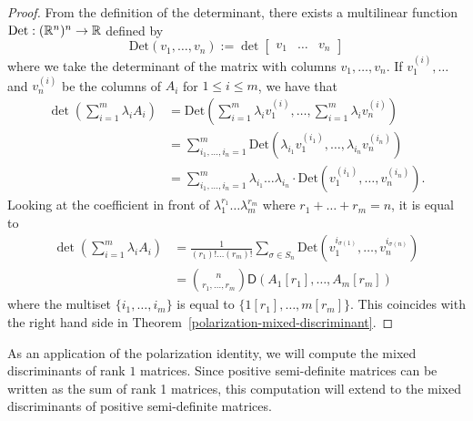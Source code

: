 \documentclass{puthesis-UG}
\begin{document}
\begin{proof}
	From the definition of the determinant, there exists a multilinear function $\text{Det}: (\mathbb{R}^n)^n \to \mathbb{R}$ defined by 
	\[
		\text{Det}(v_1, \ldots, v_n) := \det \begin{bmatrix} v_1 & \ldots & v_n \end{bmatrix}
	\]
	where we take the determinant of the matrix with columns $v_1, \ldots, v_n$. If $v_1^{(i)}, \ldots$ and $v_n^{(i)}$ be the columns of $A_i$ for $1 \leq i \leq m$, we have that 
	\begin{align*}
		\det \left ( \sum_{i = 1}^m \lambda_i A_i \right ) & = \text{Det} \left ( \sum_{i = 1}^m \lambda_i v_1^{(i)}, \ldots, \sum_{i = 1}^m \lambda_i v_n^{(i)} \right ) \\
		& = \sum_{i_1, \ldots, i_n = 1}^m \text{Det} (\lambda_{i_1} v_{1}^{(i_1)}, \ldots, \lambda_{i_n} v_{n}^{(i_n)} ) \\
		& = \sum_{i_1, \ldots, i_n = 1}^m \lambda_{i_1} \ldots \lambda_{i_n} \cdot \text{Det}(v_{1}^{(i_1)}, \ldots, v_{n}^{(i_n)}).
	\end{align*}
	Looking at the coefficient in front of $\lambda_1^{r_1} \ldots \lambda_m^{r_m}$ where $r_1 + \ldots + r_m = n$, it is equal to 
	\begin{align*}
		[\lambda_1^{r_1} \ldots \lambda_M^{r_m}] \det \left ( \sum_{i = 1}^m \lambda_i A_i \right ) & = \frac{1}{(r_1)! \ldots (r_m)!} \sum_{\sigma \in S_n} \text{Det}(v_1^{i_{\sigma(1)}}, \ldots, v_n^{i_{\sigma(n)}}) \\
		& = \binom{n}{r_1,\ldots, r_m} \mathsf{D}(A_1[r_1], \ldots, A_m[r_m])
	\end{align*}
	where the multiset $\{i_1, \ldots, i_m\}$ is equal to $\{1[r_1], \ldots, m[r_m]\}.$ This coincides with the right hand side in Theorem~\ref{polarization-mixed-discriminant}.
\end{proof}

As an application of the polarization identity, we will compute the mixed discriminants of rank $1$ matrices. Since positive semi-definite matrices can be written as the sum of rank 1 matrices, this computation will extend to the mixed discriminants of positive semi-definite matrices. 
\end{document}
